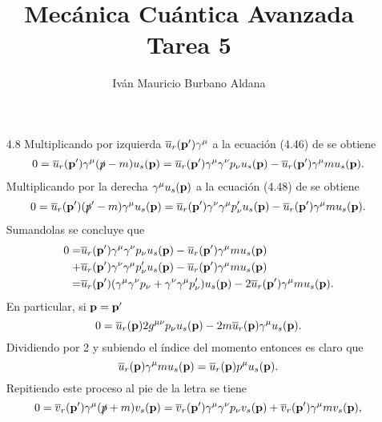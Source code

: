 \documentclass{article}
\author{Iván Mauricio Burbano Aldana}
\title{Mecánica Cuántica Avanzada\\Tarea 5}
\begin{document}
\maketitle

\begin{enumerate}

\item[4.8] Multiplicando por izquierda $\overline{u}_r(\vb{p'})\gamma^\mu$ a la ecuación (4.46) de \cite{Lahiri2005} se obtiene
\begin{equation}
0=\overline{u}_r(\vb{p'})\gamma^\mu(\slashed{p}-m)u_s(\vb{p})=\overline{u}_r(\vb{p'})\gamma^\mu\gamma^\nu p_\nu u_s(\vb{p})-\overline{u}_r(\vb{p'})\gamma^\mu m u_s(\vb{p}).
\end{equation}
Multiplicando por la derecha $\gamma^\mu u_s(\vb{p})$ a la ecuación (4.48) de \cite{Lahiri2005} se obtiene
\begin{equation}
0=\overline{u}_r(\vb{p'})(\slashed{p}'-m)\gamma^\mu u_s(\vb{p})=\overline{u}_r(\vb{p'})\gamma^\nu\gamma^\mu p'_\nu u_s(\vb{p})-\overline{u}_r(\vb{p'})\gamma^\mu m u_s(\vb{p}).
\end{equation}
Sumandolas se concluye que
\begin{align}\label{ec:u_original}
\begin{split}
0=&\overline{u}_r(\vb{p'})\gamma^\mu\gamma^\nu p_\nu u_s(\vb{p})-\overline{u}_r(\vb{p'})\gamma^\mu m u_s(\vb{p})\\
+&\overline{u}_r(\vb{p'})\gamma^\nu\gamma^\mu p'_\nu u_s(\vb{p})-\overline{u}_r(\vb{p'})\gamma^\mu m u_s(\vb{p})\\
=&\overline{u}_r(\vb{p'})\qty(\gamma^\mu\gamma^\nu p_\nu+\gamma^\nu\gamma^\mu p'_\nu) u_s(\vb{p})-2\overline{u}_r(\vb{p'})\gamma^\mu m u_s(\vb{p}).
\end{split}
\end{align}
En particular, si $\vb{p}=\vb{p'}$
\begin{equation}
0=\overline{u}_r(\vb{p})2g^{\mu\nu} p_\nu u_s(\vb{p})-2m\overline{u}_r(\vb{p})\gamma^\mu u_s(\vb{p}).
\end{equation}
Dividiendo por 2 y subiendo el índice del momento entonces es claro que
\begin{equation}\label{ec:u}
\overline{u}_r(\vb{p})\gamma^\mu m u_s(\vb{p})=\overline{u}_r(\vb{p})p^\mu u_s(\vb{p}).
\end{equation}
Repitiendo este proceso al pie de la letra se tiene
\begin{equation}
0=\overline{v}_r(\vb{p'})\gamma^\mu(\slashed{p}+m)v_s(\vb{p})=\overline{v}_r(\vb{p'})\gamma^\mu\gamma^\nu p_\nu v_s(\vb{p})+\overline{v}_r(\vb{p'})\gamma^\mu m v_s(\vb{p}),

\end{equation}
\end{enumerate}
\end{document}
